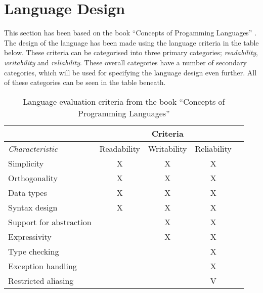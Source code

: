 \chapter{Language Design}

This section has been based on the book ``Concepts of Progamming Languages'' \cite{CoPL}. \\
The design of the language has been made using the language criteria in the table below. These criteria can be categorised into three primary categories; \textit{readability}, \textit{writability} and \textit{reliability}. These overall categories have a number of secondary categories, which will be used for specifying the language design even further. All of these categories can be seen in the table beneath.

\begin{table}[htbp]
\centering
\begin{tabular}{|l|c|c|c|c|}
\hline
& & Criteria & \\ \hline
\textit{Characteristic} & Readability & Writability & Reliability \\ \hline
Simplicity & X & X & X \\ \hline
Orthogonality & X & X & X \\ \hline
Data types & X & X & X \\ \hline
Syntax design & X & X & X  \\ \hline
Support for abstraction & & X & X  \\ \hline
Expressivity & & X & X \\ \hline
Type checking & & & X \\ \hline
Exception handling & & & X \\ \hline
Restricted aliasing & & & V \\ \hline
\end{tabular}
\caption{Language evaluation criteria from the book ``Concepts of Programming Languages''\cite{CoPL}}
\label{tbl:evaluation criteria}
\end{table}

